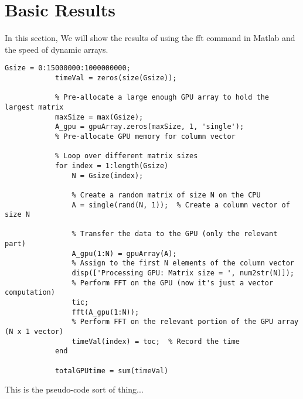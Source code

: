 \documentclass{article}
\begin{document}
    \section{Basic Results}
    \begin{sloppypar}
        \indent{}In this section, We will show the results of using the fft command in Matlab and the speed of dynamic arrays. 
        
        \begin{lstlisting}[style=Matlab-editor]
            Gsize = 0:15000000:1000000000; 
            timeVal = zeros(size(Gsize));
    
            % Pre-allocate a large enough GPU array to hold the largest matrix
            maxSize = max(Gsize);  
            A_gpu = gpuArray.zeros(maxSize, 1, 'single');  
            % Pre-allocate GPU memory for column vector
            
            % Loop over different matrix sizes
            for index = 1:length(Gsize)
                N = Gsize(index);
                
                % Create a random matrix of size N on the CPU
                A = single(rand(N, 1));  % Create a column vector of size N
                
                % Transfer the data to the GPU (only the relevant part)
                A_gpu(1:N) = gpuArray(A);  
                % Assign to the first N elements of the column vector
                disp(['Processing GPU: Matrix size = ', num2str(N)]);
                % Perform FFT on the GPU (now it's just a vector computation)
                tic;
                fft(A_gpu(1:N));  
                % Perform FFT on the relevant portion of the GPU array (N x 1 vector)
                timeVal(index) = toc;  % Record the time
            end
            
            totalGPUtime = sum(timeVal)
        \end{lstlisting}
        This is the pseudo-code sort of thing...
        
    \end{sloppypar}
\printbibliography
\end{document}

